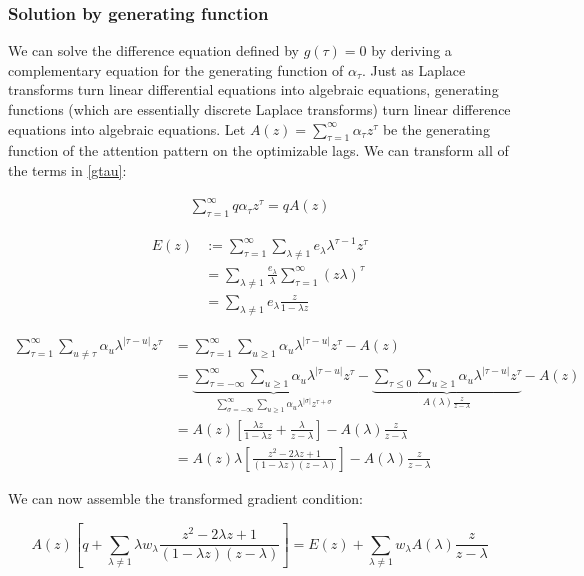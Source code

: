 \documentclass{article}
\begin{document}
 


\subsubsection{Solution by generating function}
We can solve the difference equation defined by $g(\tau) = 0$ by deriving a complementary equation for the generating function of $\alpha_\tau$. Just as Laplace transforms turn linear differential equations into algebraic equations, generating functions (which are essentially discrete Laplace transforms) turn linear difference equations into algebraic equations. Let $A(z) = \sum_{\tau=1}^\infty \alpha_\tau z^\tau$ be the generating function of the attention pattern on the optimizable lags. We can transform all of the terms in \eqref{gtau}:

\begin{align}
    \sum_{\tau=1}^\infty q \alpha_\tau z^\tau = q A(z)
\end{align}

\begin{align}
    E(z) &:= \sum_{\tau=1}^\infty\sum_{\lambda\neq 1}e_\lambda \lambda^{\tau-1}z^\tau \\
    &=\sum_{\lambda \neq1 }\frac{e_\lambda}{\lambda}\sum_{\tau=1}^\infty (z\lambda)^\tau \\
    &= \sum_{\lambda\neq 1}e_\lambda \frac{z}{1-\lambda z}
\end{align}

\begin{align}
    \sum_{\tau=1}^\infty \sum_{u \neq \tau} \alpha_u \lambda^{|\tau - u|}z^\tau &=  \sum_{\tau=1}^\infty \sum_{u\ge 1} \alpha_u \lambda^{|\tau - u|}z^\tau - A(z) \\
    &= \underbrace{\sum_{\tau=-\infty}^\infty \sum_{u\ge 1} \alpha_u \lambda^{|\tau - u|}z^\tau}_{\sum_{\sigma=-\infty}^\infty \sum_{u\ge 1} \alpha_u \lambda^{|\sigma|}z^{\tau+\sigma}}  
    - \underbrace{\sum_{\tau\le 0}\sum_{u\ge 1} \alpha_u \lambda^{|\tau - u|}z^\tau}_{A(\lambda)\frac{z}{z-\lambda}} 
    - A(z) \\
    &= A(z)\left[\frac{\lambda z}{1-\lambda z} + \frac{\lambda}{z-\lambda} \right] - A(\lambda)\frac{z}{z-\lambda}\\
    &= A(z)\lambda\left[\frac{z^2 -2\lambda z + 1}{(1-\lambda z)(z-\lambda)} \right] - A(\lambda)\frac{z}{z-\lambda}
\end{align}

We can now assemble the transformed gradient condition:

\begin{equation}
    A(z)\left[q + \sum_{\lambda\neq 1}\lambda w_\lambda  \frac{z^2 -2\lambda z + 1}{(1-\lambda z)(z-\lambda)} \right] = E(z) + \sum_{\lambda\neq 1}w_\lambda A(\lambda)\frac{z}{z-\lambda}
\end{equation}
\end{document}
